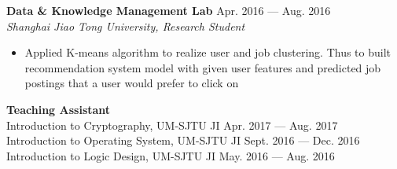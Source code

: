 \documentclass[margin,line,10pt]{res}
\begin{document}
\begin{resume}
{\small
{\bf\normalsize Data \& Knowledge Management Lab} \hfill Apr. 2016 --- Aug. 2016 \\
{\it Shanghai Jiao Tong University, Research Student} 
}
\begin{itemize}
\setlength{\itemsep}{0pt}
\setlength{\parskip}{0pt}
\setlength{\parsep}{0pt}
\item {\small Applied K-means algorithm to realize user and job clustering. Thus to built recommendation system model with given user features and predicted job postings that a user would prefer to click on}
\end{itemize}

{
\small
{\bf\normalsize Teaching Assistant} \\
{Introduction to Cryptography, UM-SJTU JI} \hfill Apr. 2017 --- Aug. 2017\\
{Introduction to Operating System, UM-SJTU JI} \hfill Sept. 2016 --- Dec. 2016\\
{Introduction to Logic Design, UM-SJTU JI} \hfill May. 2016 --- Aug. 2016 
}



\end{resume}
\end{document}
